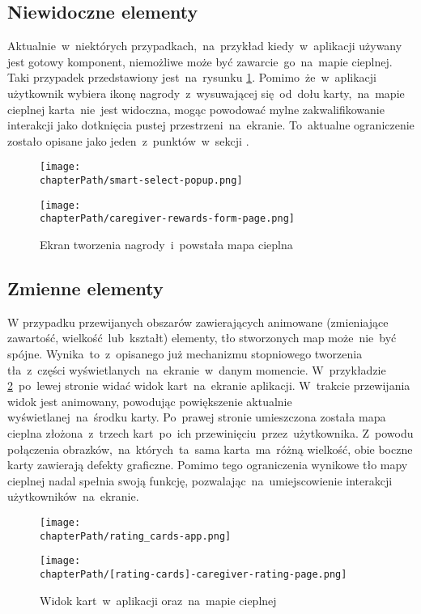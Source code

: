 \subsection{Niewidoczne elementy}
Aktualnie~w~niektórych przypadkach,~na~przykład kiedy~w~aplikacji używany jest gotowy komponent, niemożliwe może być zawarcie~go~na~mapie cieplnej. Taki przypadek przedstawiony jest~na~rysunku \ref{fig:rs_reward_form}. Pomimo~że~w~aplikacji użytkownik wybiera ikonę nagrody~z~wysuwającej się~od~dołu karty,~na~mapie cieplnej karta~nie~jest widoczna, mogąc powodować mylne zakwalifikowanie interakcji jako dotknięcia pustej przestrzeni~na~ekranie. To~aktualne ograniczenie zostało opisane jako jeden~z~punktów~w~sekcji .

\bigskip
\begin{figure}[H]
\centering
\begin{minipage}{.3\textwidth}
	\centering
	\texttt{[image: \\chapterPath/smart-select-popup.png]}
\end{minipage}
\begin{minipage}{.3\textwidth}
	\centering
	\texttt{[image: \\chapterPath/caregiver-rewards-form-page.png]}
\end{minipage}
\bigskip
\caption{Ekran tworzenia nagrody~i~powstała mapa cieplna}
\label{fig:rs_reward_form}
\end{figure}

\subsection{Zmienne elementy}
W przypadku przewijanych obszarów zawierających animowane (zmieniające zawartość, wielkość~lub~kształt) elementy, tło stworzonych map może~nie~być spójne. Wynika~to~z~opisanego już mechanizmu stopniowego tworzenia tła~z~części wyświetlanych~na~ekranie~w~danym momencie. W~przykładzie \ref{fig:rs_rating_cards}~po~lewej stronie widać widok kart~na~ekranie aplikacji. W~trakcie przewijania widok jest animowany, powodując powiększenie aktualnie wyświetlanej~na~środku karty. Po~prawej stronie umieszczona została mapa cieplna złożona~z~trzech kart~po~ich przewinięciu~przez~użytkownika. Z~powodu połączenia obrazków,~na~których~ta~sama karta~ma~różną wielkość, obie boczne karty zawierają defekty graficzne. Pomimo tego ograniczenia wynikowe tło mapy cieplnej nadal spełnia swoją funkcję, pozwalając~na~umiejscowienie interakcji użytkowników~na~ekranie.

\bigskip
\begin{figure}[H]
\begin{minipage}{.25\textwidth}
	\centering
	\texttt{[image: \\chapterPath/rating\_cards-app.png]}
\end{minipage}
\begin{minipage}{.74\textwidth}
	\centering
	\texttt{[image: \\chapterPath/[rating-cards]-caregiver-rating-page.png]}
\end{minipage}
\bigskip
\caption{Widok kart~w~aplikacji oraz~na~mapie cieplnej}
\label{fig:rs_rating_cards}
\end{figure}
